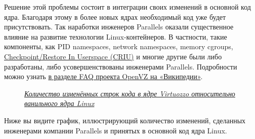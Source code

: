 \documentclass[14pt, a4paper]{article}
\begin{document}
Решение этой проблемы состоит в интеграции своих изменений в основной код ядра. Благодаря
этому в более новых ядрах необходимый код уже будет присутствовать. Так наработки инженеров
Parallels оказали существенное влияние на развитие технологии Linux-контейнеров. В частности,
такие компоненты, как PID namespaces, network namespaces, memory cgroups, \href{https://criu.org/}{Checkpoint/Restore In
Userspace (CRIU)} и многие другие были либо разработаны, либо усовершенствованы инженерами
Parallels. Подробности можно узнать \href{https://wiki.openvz.org/FAQ#When_OpenVZ_will_be_in_upstream_kernel.3F}{в разделе FAQ проекта OpenVZ на «Википедии»}.

\begin{figure}[H]
    \centering
    \caption*{\textit{\href{https://www.slideshare.net/openvz/whats-missing-from-upstream-kernel-containers-kir-kolyshkin}{Количество изменённых строк кода в ядре Virtuozzo относительно ванильного ядра Linux}}}
    \label{3.0}
\end{figure}

Ниже вы видите график, иллюстрирующий количество изменений, сделанных инженерами компании
Parallels и принятых в основной код ядра Linux.

\begin{figure}[H]
    \centering
    \label{3.1}
\end{figure}
\end{document}
